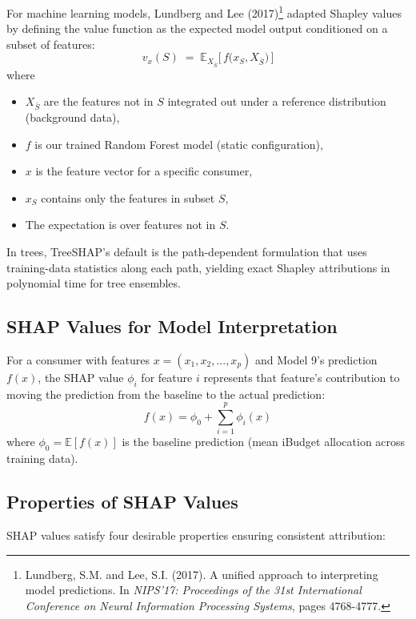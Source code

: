 For machine learning models, Lundberg and Lee (2017)\footnote{Lundberg, S.M. and Lee, S.I. (2017). A unified approach to interpreting model predictions. In \textit{NIPS'17: Proceedings of the 31st International Conference on Neural Information Processing Systems}, pages 4768-4777.} adapted Shapley values by defining the value function as the expected model output conditioned on a subset of features:
%
\begin{equation}
v_x(S) \;=\; \mathbb{E}_{X_{\bar S}}\!\big[\,f\big(x_S, X_{\bar S}\big)\,\big]
\label{eq:value_function}
\end{equation}
where 
\begin{itemize}
    \item $X_{\bar S}$ are the features not in $S$ integrated out under a reference distribution (background data), 
     \item $f$ is our trained Random Forest model (static configuration), 
     \item $x$ is the feature vector for a specific consumer, 
     \item $x_S$ contains only the features in subset $S$, 
     \item The expectation is over features not in $S$.
\end{itemize}
%
In trees, TreeSHAP's default is the path-dependent formulation that uses training-data statistics along each path, yielding exact Shapley attributions in polynomial time for tree ensembles.

\subsection{SHAP Values for Model Interpretation}

For a consumer with features $x = (x_1, x_2, ..., x_p)$ and Model 9's prediction $f(x)$, the SHAP value $\phi_i$ for feature $i$ represents that feature's contribution to moving the prediction from the baseline to the actual prediction:
%
\begin{equation}
f(x) = \phi_0 + \sum_{i=1}^{p} \phi_i(x)
\label{eq:shap_decomposition}
\end{equation}
%
where $\phi_0 = \mathbb{E}[f(x)]$ is the baseline prediction (mean iBudget allocation across training data).

\subsection{Properties of SHAP Values}
SHAP values satisfy four desirable properties ensuring consistent attribution:

